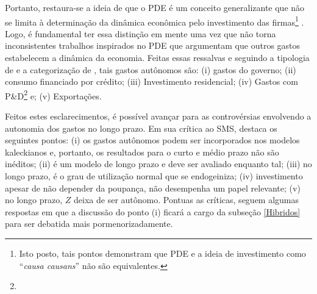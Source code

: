 Portanto, restaura-se a ideia de que o PDE é um conceito generalizante que não se limita à determinação da dinâmica econômica pelo investimento das firmas\footnote{
	Isto posto, tais pontos demonstram que PDE e a ideia de investimento como ``\textit{causa causans}'' não são equivalentes.}
\cite{brochier_macroeconomics_2017}. 
Logo, é fundamental ter essa distinção em mente uma vez que não torna inconsistentes trabalhos inspirados no PDE que argumentam que  outros gastos estabelecem a dinâmica da economia.
Feitas essas ressalvas e seguindo a tipologia de \textcite{cesaratto_technical_2003} e a categorização de \textcite{serrano_sraffian_1995}, tais gastos autônomos são: (i) gastos do governo; (ii) consumo financiado por crédito; (iii) Investimento residencial; (iv) Gastos com P\&D\footnote{
} e; (v) Exportações.

Feitos estes esclarecimentos, é possível avançar para as controvérsias envolvendo a autonomia dos gastos no longo prazo. 
Em sua crítica ao SMS, \textcite{nikiforos_comments_2018} destaca os seguintes pontos: 
(i) os gastos autônomos podem ser incorporados nos modelos kaleckianos e, portanto, os resultados para o curto e médio prazo não são inéditos; 
(ii) é um modelo de longo prazo e deve ser avaliado enquanto tal; 
(iii) no longo prazo, é o grau de utilização normal que se endogeiniza; 
(iv) investimento apesar de não depender da poupança, não desempenha um papel relevante; 
(v) no longo prazo, $Z$ deixa de ser autônomo.  
Pontuas as críticas, seguem algumas respostas em que a discussão do ponto (i) ficará a cargo da subseção \ref{Hibridos} para ser debatida mais pormenorizadamente.

